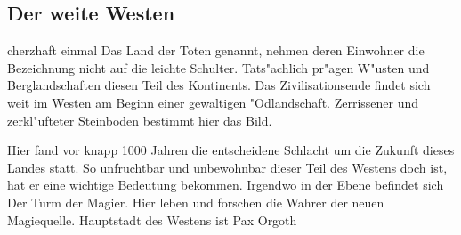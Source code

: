 \subsection{Der weite Westen}
cherzhaft einmal
\glqq Das Land der Toten\grqq{} genannt,
nehmen deren Einwohner die Bezeichnung nicht auf die leichte
Schulter.
Tats"achlich pr"agen W"usten und Berglandschaften diesen Teil des
Kontinents. Das Zivilisationsende findet sich weit im Westen am
Beginn einer gewaltigen "Odlandschaft. Zerrissener und zerkl"ufteter
Steinboden bestimmt hier das Bild. \par Hier fand vor knapp 1000
Jahren die entscheidene Schlacht um die Zukunft dieses Landes statt.
So unfruchtbar und unbewohnbar dieser Teil des Westens doch ist, hat
er eine wichtige Bedeutung bekommen. Irgendwo in der Ebene befindet
sich \glqq Der Turm der Magier\grqq{}. Hier
leben und forschen die Wahrer der neuen Magiequelle. Hauptstadt des
Westens ist Pax Orgoth
